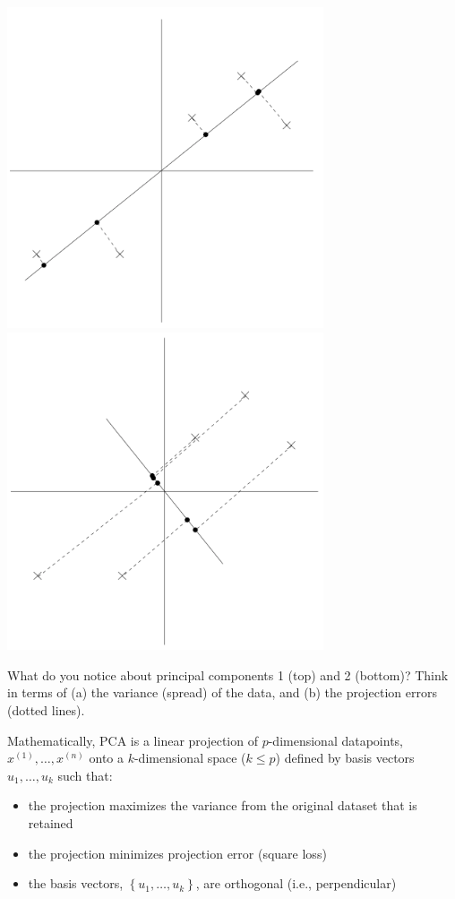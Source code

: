 \begin{center}
\includegraphics[width=0.7\textwidth]{img/l04-ang-pc1.png}
\includegraphics[width=0.7\textwidth]{img/l04-ang-pc2.png}
\end{center}

\begin{question}{}
What do you notice about principal components 1 (top) and 2 (bottom)? Think in terms of (a) the variance (spread) of the data, and (b) the projection errors (dotted lines). 
\end{question}

Mathematically, PCA is a linear projection of $p$-dimensional datapoints, $x^{(1)}, \dots, x^{(n)}$ onto a $k$-dimensional space ($k \leq p$) defined by basis vectors $u_1, \dots, u_k$ such that:
\begin{itemize}
\item the projection maximizes the variance from the original dataset that is retained
\item the projection minimizes projection error (square loss)
\item the basis vectors, $\left\{u_1, \dots, u_k\right\}$, are orthogonal (i.e., perpendicular)
\end{itemize}

